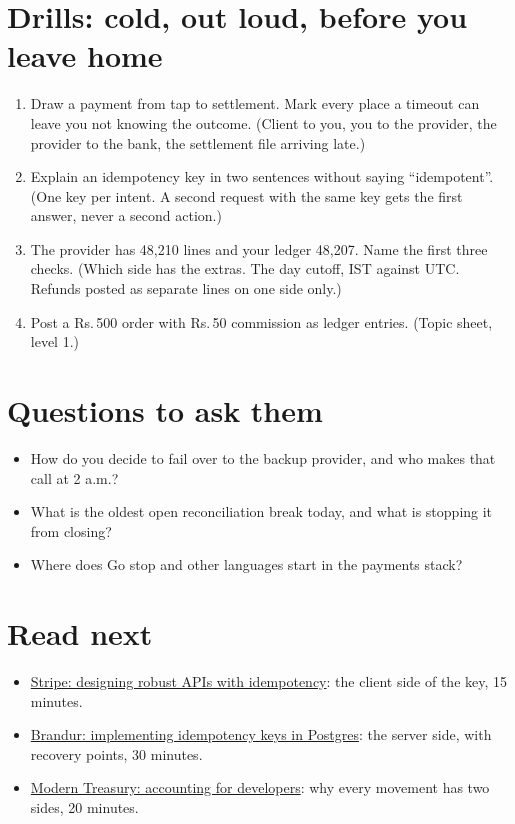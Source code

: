 \documentclass[10pt,a4paper]{article}
\begin{document}
\section{Drills: cold, out loud, before you leave home}
\begin{enumerate}[leftmargin=1.4em,itemsep=1pt]
  \item Draw a payment from tap to settlement. Mark every place a timeout can leave you not knowing the outcome. (Client to you, you to the provider, the provider to the bank, the settlement file arriving late.)
  \item Explain an idempotency key in two sentences without saying ``idempotent''. (One key per intent. A second request with the same key gets the first answer, never a second action.)
  \item The provider has 48,210 lines and your ledger 48,207. Name the first three checks. (Which side has the extras. The day cutoff, IST against UTC. Refunds posted as separate lines on one side only.)
  \item Post a Rs.\,500 order with Rs.\,50 commission as ledger entries. (Topic sheet, level 1.)
\end{enumerate}

\section{Questions to ask them}
\begin{itemize}
  \item How do you decide to fail over to the backup provider, and who makes that call at 2 a.m.?
  \item What is the oldest open reconciliation break today, and what is stopping it from closing?
  \item Where does Go stop and other languages start in the payments stack?
\end{itemize}

\section{Read next}
\begin{itemize}
  \item \href{https://stripe.com/blog/idempotency}{Stripe: designing robust APIs with idempotency}: the client side of the key, 15 minutes.
  \item \href{https://brandur.org/idempotency-keys}{Brandur: implementing idempotency keys in Postgres}: the server side, with recovery points, 30 minutes.
  \item \href{https://www.moderntreasury.com/journal/accounting-for-developers-part-i}{Modern Treasury: accounting for developers}: why every movement has two sides, 20 minutes.
\end{itemize}
\end{document}
